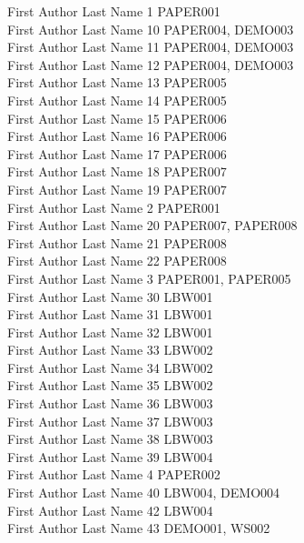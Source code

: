 \begin{multicols}{2}
First Author Last Name 1 \dotfill PAPER001\\
First Author Last Name 10 \dotfill PAPER004, DEMO003\\
First Author Last Name 11 \dotfill PAPER004, DEMO003\\
First Author Last Name 12 \dotfill PAPER004, DEMO003\\
First Author Last Name 13 \dotfill PAPER005\\
First Author Last Name 14 \dotfill PAPER005\\
First Author Last Name 15 \dotfill PAPER006\\
First Author Last Name 16 \dotfill PAPER006\\
First Author Last Name 17 \dotfill PAPER006\\
First Author Last Name 18 \dotfill PAPER007\\
First Author Last Name 19 \dotfill PAPER007\\
First Author Last Name 2 \dotfill PAPER001\\
First Author Last Name 20 \dotfill PAPER007, PAPER008\\
First Author Last Name 21 \dotfill PAPER008\\
First Author Last Name 22 \dotfill PAPER008\\
First Author Last Name 3 \dotfill PAPER001, PAPER005\\
First Author Last Name 30 \dotfill LBW001\\
First Author Last Name 31 \dotfill LBW001\\
First Author Last Name 32 \dotfill LBW001\\
First Author Last Name 33 \dotfill LBW002\\
First Author Last Name 34 \dotfill LBW002\\
First Author Last Name 35 \dotfill LBW002\\
First Author Last Name 36 \dotfill LBW003\\
First Author Last Name 37 \dotfill LBW003\\
First Author Last Name 38 \dotfill LBW003\\
First Author Last Name 39 \dotfill LBW004\\
First Author Last Name 4 \dotfill PAPER002\\
First Author Last Name 40 \dotfill LBW004, DEMO004\\
First Author Last Name 42 \dotfill LBW004\\
First Author Last Name 43 \dotfill DEMO001, WS002\\

\end{multicols}
